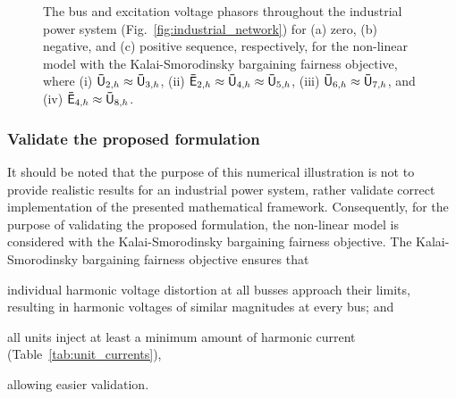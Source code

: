 \begin{figure}
{    }
    \caption{The bus and excitation voltage phasors throughout the industrial power system (Fig.~\ref{fig:industrial_network}) for (a) zero, (b) negative, and (c) positive sequence, respectively, for the non-linear model with the Kalai-Smorodinsky bargaining fairness objective, where (i) $\mathsf{\bar{U}}_{2,h} \approx \mathsf{\bar{U}}_{3,h}$, (ii) $\mathsf{\bar{E}}_{2,h} \approx \mathsf{\bar{U}}_{4,h} \approx \mathsf{\bar{U}}_{5,h}$, (iii) 
    $\mathsf{\bar{U}}_{6,h}\approx\mathsf{\bar{U}}_{7,h}$, and (iv) $\mathsf{\bar{E}}_{4,h}\approx\mathsf{\bar{U}}_{8,h}$.}
    \label{fig:voltage_results}
\end{figure}

\subsubsection{Validate the proposed formulation} 

It should be noted that the purpose of this numerical illustration is not to provide realistic results for an industrial power system, rather validate correct implementation of the presented mathematical framework. Consequently, for the purpose of validating the proposed formulation, the non-linear model is considered with the Kalai-Smorodinsky bargaining fairness objective. The Kalai-Smorodinsky bargaining fairness objective ensures that 
\begin{enumerate*}
    \item [(i)] individual harmonic voltage distortion at all busses approach their limits, resulting in harmonic voltages of similar magnitudes at every bus; and
    \item [(ii)] all units inject at least a minimum amount of harmonic current (Table~\ref{tab:unit_currents}), 
\end{enumerate*}
allowing easier validation. 

